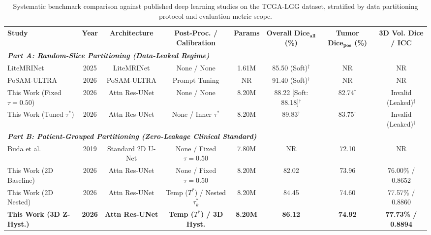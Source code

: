 \documentclass[preprint,3p,times,onecolumn]{elsarticle}
\begin{document}
\begin{table}[tbp]
\centering
\caption{Systematic benchmark comparison against published deep learning studies on the TCGA-LGG dataset, stratified by data partitioning protocol and evaluation metric scope.}
\label{tab:sota_comparison}
\setlength{\tabcolsep}{2.0pt}
\scriptsize
\begin{tabular*}{\textwidth}{@{\extracolsep{\fill}}lccccccc}
\toprule
\textbf{Study} & \textbf{Year} & \textbf{Architecture} & \shortstack{\textbf{Post-Proc. /} \\ \textbf{Calibration}} & \textbf{Params} & \shortstack{\textbf{Overall} \\ $\mathbf{\text{Dice}_{\text{all}}}$ \textbf{(\%)}} & \shortstack{\textbf{Tumor} \\ $\mathbf{\text{Dice}_{\text{pos}}}$ \textbf{(\%)}} & \shortstack{\textbf{3D Vol. Dice} \\ \textbf{/ ICC}} \\
\midrule
\multicolumn{8}{l}{\textit{\textbf{Part A: Random-Slice Partitioning (Data-Leaked Regime)}}} \\
LiteMRINet~\cite{yuan2025enhanced} & 2025 & LiteMRINet & None / None & 1.61M & 85.50 (Soft)$^\dagger$ & NR & NR \\
PoSAM-ULTRA~\cite{alhatamleh2026attention} & 2026 & PoSAM-ULTRA & Prompt Tuning & NR & 91.40 (Soft)$^\dagger$ & NR & NR \\
This Work (Fixed $\tau=0.50$) & 2026 & Attn Res-UNet & None / None & 8.20M & 88.22 [Soft: 88.18]$^\dagger$ & 82.74$^\dagger$ & Invalid (Leaked)$^\ddagger$ \\
This Work (Tuned $\tau^*$) & 2026 & Attn Res-UNet & None / Inner $\tau^*$ & 8.20M & 89.83$^\dagger$ & 83.75$^\dagger$ & Invalid (Leaked)$^\ddagger$ \\
\midrule
\multicolumn{8}{l}{\textit{\textbf{Part B: Patient-Grouped Partitioning (Zero-Leakage Clinical Standard)}}} \\
Buda et al.~\cite{buda2019association} & 2019 & Standard 2D U-Net & None / Fixed $\tau=0.50$ & 7.80M & NR & 72.10 & NR \\
This Work (2D Baseline) & 2026 & Attn Res-UNet & None / Fixed $\tau=0.50$ & 8.20M & 82.02 & 73.96 & 76.00\% / 0.8652 \\
This Work (2D Nested) & 2026 & Attn Res-UNet & Temp ($T^*$) / Nested $\tau_k^*$ & 8.20M & 84.45 & 74.60 & 77.57\% / 0.8860 \\
\textbf{This Work (3D Z-Hyst.)} & \textbf{2026} & \textbf{Attn Res-UNet} & \textbf{Temp ($T^*$) / 3D Hyst.} & \textbf{8.20M} & \textbf{86.12} & \textbf{74.92} & \textbf{77.73\% / 0.8894} \\

\end{tabular*}
\end{table}
\end{document}
